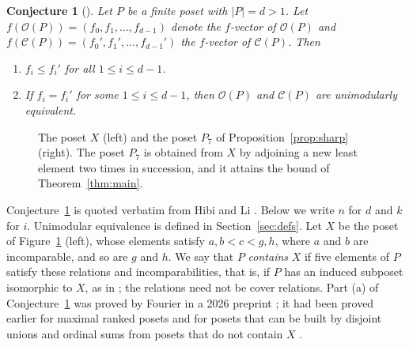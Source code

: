 \documentclass[11pt]{article}
\newtheorem{conjecture}[theorem]{Conjecture}
\theoremstyle{definition}
\theoremstyle{remark}
\newcommand{\OO}{\mathcal O}
\newcommand{\CC}{\mathcal C}
\begin{document}
\begin{conjecture}[{\cite[Conjecture~2.4, p.~12]{HL}}]\label{conj:HL}
Let $P$ be a finite poset with $|P|=d>1$. Let
$f(\OO(P))=(f_0,f_1,\ldots,f_{d-1})$ denote the $f$-vector of
$\OO(P)$ and $f(\CC(P))=(f_0',f_1',\ldots,f_{d-1}')$ the $f$-vector of
$\CC(P)$. Then
\begin{enumerate}
\item[(a)] $f_i\leq f_i'$ for all $1\leq i\leq d-1$.
\item[(b)] If $f_i=f_i'$ for some $1\leq i\leq d-1$, then $\OO(P)$ and
$\CC(P)$ are unimodularly equivalent.
\end{enumerate}
\end{conjecture}

\begin{figure}[htb]
\centering
\begin{minipage}{0.40\textwidth}
\centering
{}
\qquad\qquad
{}
\end{minipage}\hfill
\begin{minipage}{0.56\textwidth}
\caption{The poset $X$ (left) and the poset $P_7$ of Proposition~\ref{prop:sharp} (right). The poset $P_7$ is obtained from $X$ by adjoining a new least element two times in succession, and it attains the bound of Theorem~\ref{thm:main}.}\label{fig:X}
\end{minipage}
\end{figure}
Conjecture~\ref{conj:HL} is quoted verbatim from Hibi and Li \cite{HL}. Below we write $n$
for $d$ and $k$ for $i$. Unimodular equivalence is defined in Section~\ref{sec:defs}. Let $X$ be the poset of Figure~\ref{fig:X} (left), whose elements satisfy $a,b<c<g,h$, where $a$ and $b$ are incomparable, and so are $g$ and $h$. We say that $P$ \emph{contains} $X$ if five
elements of $P$ satisfy these relations and incomparabilities, that is, if $P$ has an induced subposet isomorphic to $X$, as in \cite[Theorem~2.1]{HL}; the relations need not be cover relations. Part (a) of Conjecture~\ref{conj:HL} was proved by Fourier in a 2026 preprint \cite[Theorem~1.1]{Fourier}; it had been proved earlier for maximal ranked posets \cite[Corollary~4.2]{AFJ} and for posets that can be built by disjoint unions and ordinal sums from posets that do not contain $X$ \cite[Theorem~1]{FHL}.
\end{document}
